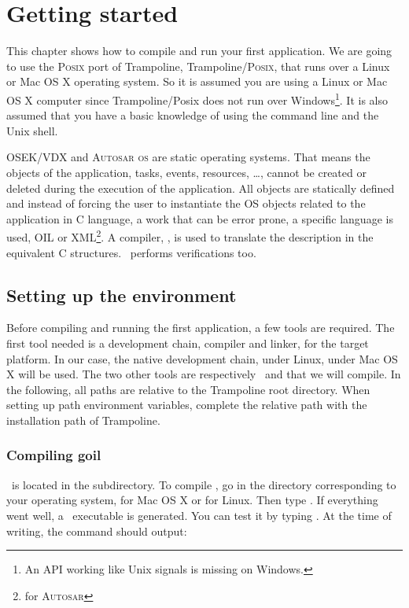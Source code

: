 
\chapter{Getting started}

This chapter shows how to compile and run your first application. We are going to use the \textsc{Posix} port of Trampoline, Trampoline/\textsc{Posix}, that runs over a Linux or Mac OS X operating system. So it is assumed you are using a Linux or Mac OS X computer since Trampoline/Posix does not run over Windows\footnote{An API working like Unix signals is missing on Windows.}. It is also assumed that you have a basic knowledge of using the command line and the Unix shell.

OSEK/VDX and \textsc{Autosar os} are static operating systems. That means the objects of the application, tasks, events, resources, \ldots, cannot be created or deleted during the execution of the application. All objects are statically defined and instead of forcing the user to instantiate the OS objects related to the application in C language, a work that can be error prone, a specific language is used, OIL or XML\footnote{for \textsc{Autosar}}. A compiler, \goil, is used to translate the description in the equivalent C structures. \goil\ performs verifications too.

\section{Setting up the environment}

Before compiling and running the first application, a few tools are required. The first tool needed is a development chain, compiler and linker, for the target platform. In our case, the native development chain,  under Linux,  under Mac OS X will be used. The two other tools are respectively \goil\ and  that we will compile. In the following, all paths are relative to the Trampoline root directory. When setting up path environment variables, complete the relative path with the installation path of Trampoline.

\subsection{Compiling goil}

\goil\ is located in the  subdirectory. To compile \goil, go in the directory corresponding to your operating system,  for Mac OS X or  for Linux. Then type . If everything went well, a \goil\ executable is generated. You can test it by typing . At the time of writing, the command should output:

